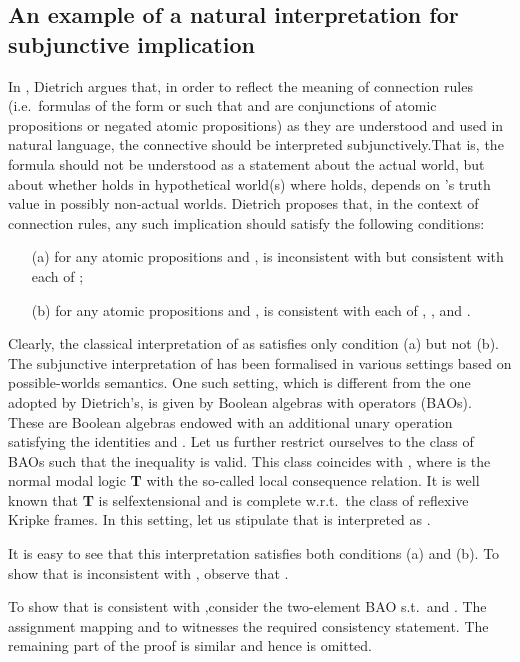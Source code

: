 \documentclass{llncs}
\numberwithin{equation}{section}
\begin{document}
\subsection{An example of a natural interpretation for subjunctive implication}

In \cite{Di10}, Dietrich argues that, in order to reflect the meaning of connection rules (i.e.\  formulas of the form  or  such that  and  are conjunctions of atomic propositions or negated atomic propositions) as they are understood and used in natural language, the connective  should be interpreted subjunctively.That is, the formula  should not be understood as a statement about the actual
world, but about whether  holds in hypothetical world(s) where  holds,  depends on 's truth value in possibly non-actual worlds.
Dietrich proposes that, in the context of connection rules, any such implication should satisfy the following conditions:
\begin{itemize}
\item[(a)] for any atomic propositions  and ,   is inconsistent
with  but consistent with each of      ;

\item[(b)] for any  atomic propositions  and ,   is consistent with each of ,  ,   and  .
\end{itemize}
Clearly, the classical interpretation of  as  satisfies only condition (a) but not (b).  The subjunctive interpretation of  has been formalised in various settings based on possible-worlds semantics. One such setting, which is different from the one adopted by Dietrich's, is given by Boolean algebras with operators (BAOs). These are Boolean algebras endowed with an additional unary operation  satisfying the identities  and . Let us further restrict ourselves to the class of BAOs such that the inequality  is valid. This class coincides with , where  is the normal modal logic {\bf T} with the so-called local consequence relation. It is well known that {\bf T} is selfextensional and is complete w.r.t.\ the class of reflexive Kripke frames.  In this setting, let us stipulate that  is interpreted as . 

It is easy to see that this interpretation satisfies both conditions (a) and (b).
To show that  is inconsistent with , observe that . 

To show that  is consistent with ,consider the two-element BAO s.t.\  and . The assignment mapping  and  to  witnesses the required consistency statement. The remaining part of the proof is similar and hence is omitted.
\end{document}
